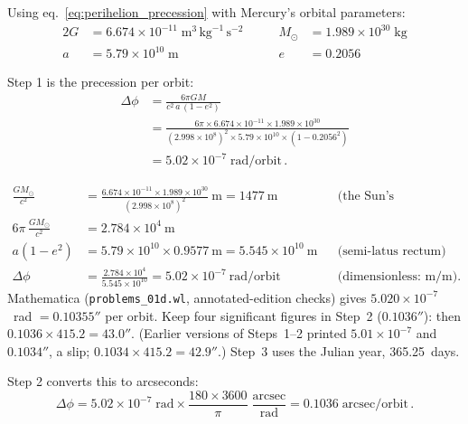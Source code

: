 Using eq.~\eqref{eq:perihelion_precession} with Mercury's orbital parameters:
\begin{alignat*}{2}
    G &= 6.674 \times 10^{-11} \; \text{m}^3\,\text{kg}^{-1}\,\text{s}^{-2} & \qquad
    M_\odot &= 1.989 \times 10^{30} \; \text{kg} \\
    a &= 5.79 \times 10^{10} \; \text{m} & \qquad
    e &= 0.2056
\end{alignat*}

Step 1 is the precession per orbit:
\begin{align*}
    \Delta\phi &= \frac{6\pi G M}{c^2\, a\,(1 - e^2)} \\
    &= \frac{6\pi \times 6.674\!\times\!10^{-11} \times 1.989\!\times\!10^{30}}
    {(2.998\!\times\!10^{8})^2 \times 5.79\!\times\!10^{10} \times (1 - 0.2056^2)} \\
    &= 5.02 \times 10^{-7} \;\text{rad/orbit} \,.
\end{align*}

\begin{derivation}
\begin{align*}
\frac{GM_\odot}{c^2} &= \frac{6.674\times10^{-11}\times1.989\times10^{30}}
  {(2.998\times10^8)^2}~\text{m} = 1477~\text{m}
  && \text{(the Sun's gravitational radius)} \\
6\pi\,\frac{GM_\odot}{c^2} &= 2.784\times10^4~\text{m} \\
a(1 - e^2) &= 5.79\times10^{10}\times0.9577~\text{m} = 5.545\times10^{10}~\text{m}
  && \text{(semi-latus rectum)} \\
\Delta\phi &= \frac{2.784\times10^4}{5.545\times10^{10}}
  = 5.02\times10^{-7}~\text{rad/orbit}
  && \text{(dimensionless: m/m)} .
\end{align*}
Mathematica (\texttt{problems\_01d.wl}, annotated-edition checks) gives
$5.020\times10^{-7}$~rad $= 0.10355''$ per orbit.  Keep four significant
figures in Step~2 ($0.1036''$): then $0.1036\times415.2 = 43.0''$.  (Earlier
versions of Steps~1--2 printed $5.01\times10^{-7}$ and $0.1034''$, a slip;
$0.1034\times415.2 = 42.9''$.)  Step~3 uses the Julian year, 365.25~days.
\end{derivation}


Step 2 converts this to arcseconds:
\begin{equation*}
    \Delta\phi = 5.02 \times 10^{-7} \;\text{rad}
    \times \frac{180 \times 3600}{\pi} \;\frac{\text{arcsec}}{\text{rad}}
    = 0.1036\;\text{arcsec/orbit} \,.
\end{equation*}

